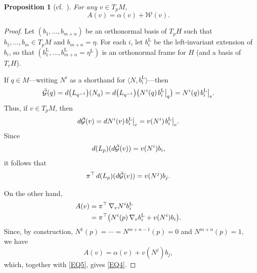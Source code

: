 \documentclass[a4paper,12pt,oneside]{amsart}
\newcommand{\diff}{\mathop{}\!d}
\newcommand{\grad}{\mathop{}\!\nabla}
\theoremstyle{plain}
\newtheorem{proposition}[theorem]{Proposition}
\theoremstyle{remark}
\theoremstyle{definition}
\begin{document}
\begin{proposition}[cf.\ {\cite[p.~769]{ripoll1993}}]\label{PROP6}
For any $v \in T_{p}M$,
\begin{equation} \label{EQ4}
A(v)  = \alpha(v) + \mathcal{W}(v).
\end{equation}
\end{proposition}
\begin{proof}
Let $(b_{1}, \dotsc, b_{m+n})$ be an orthonormal basis of $T_{p}H$ such that $b_{1},\dotsc,b_{m} \in T_{p}M$ and $b_{m+n}=\eta$. For each $i$, let $b^{\mathrm{L}}_{i}$ be the left-invariant extension of $b_{i}$, so that $(b^{\mathrm{L}}_{1}, \dotsc, b^{\mathrm{L}}_{m+n}= \eta^{\mathrm{L}})$ is an orthonormal frame for $H$ (and a basis of $T_{e}H$).

If $q \in M$---writing $N^{i}$ as a shorthand for $\langle N, b^{\mathrm{L}}_{i} \rangle$---then
\begin{equation*}
\bar{\mathcal{G}}(q) = \diff\mleft(L_{q^{-1}}\mright)\mleft(N_{q}\mright) = \diff\mleft(L_{q^{-1}}\mright) \bigl( N^{i}(q) \mleft. b^{\mathrm{L}}_{i} \mright\rvert_{q}\bigr)=N^{i}(q) \mleft. b^{\mathrm{L}}_{i}\mright \rvert_{e}.
\end{equation*}
Thus, if $v \in T_{p}M$, then
\begin{equation*}
\diff\bar{\mathcal{G}}(v) = dN^{i}(v) \mleft. b^{\mathrm{L}}_{i} \mright \rvert_{e} = v (N^{i}) \mleft. b^{\mathrm{L}}_{i} \mright \rvert_{e}.
\end{equation*}
Since
\begin{equation*}
\diff\mleft(L_{p}\mright)(\diff\bar{\mathcal{G}}(v))=v (N^{i} ) b_{i},
\end{equation*}
it follows that
\begin{equation}\label{EQ5}
\pi^{\top}\diff\mleft(L_{p}\mright)(\diff\bar{\mathcal{G}}(v))=v(N^{j}) b_{j}.
\end{equation}

On the other hand,
\begin{align*}
A(v) &= \pi^{\top}\grad_{v}N^{i}b^{\mathrm{L}}_{i}\\
&=\pi^{\top} \mleft( N^{i}(p)\grad_{v}b^{\mathrm{L}}_{i} + v(N^{i}) b_{i}\mright).
\end{align*}
Since, by construction, $N^{1}(p)= \dotsb =N^{m+n-1}(p) =0$ and $N^{m+n}(p)=1$, we have
\begin{equation} \label{EQ6}
A(v) =\alpha(v) + v(N^{j}) b_{j},
\end{equation}
which, together with \eqref{EQ5}, gives \eqref{EQ4}.
\end{proof}
\end{document}
